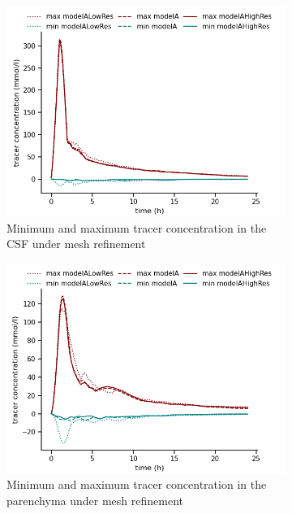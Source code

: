 \documentclass[fleqn,10pt]{wlscirep}
\begin{document}
\begin{figure}
    \centering
    \begin{subfigure}[b]{0.45\textwidth}
        \centering
        \includegraphics[width = 1 \linewidth]{figures/csf_minmax.png}
        \caption{Minimum and maximum tracer concentration in the CSF under mesh refinement}
    \end{subfigure}
    \begin{subfigure}[b]{0.45\textwidth}
        \centering
     \includegraphics[width= 1 \linewidth]{figures/par_minmax.png}
        \caption{Minimum and maximum tracer concentration in the parenchyma under mesh refinement}
    \end{subfigure}
    \begin{subfigure}[b]{0.45\textwidth}

\end{subfigure}
\end{figure}
\end{document}
